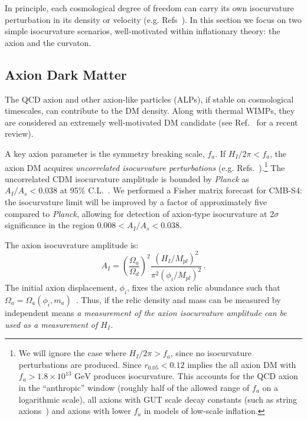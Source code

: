 In principle, each cosmological degree of freedom can carry its own isocurvature perturbation in its density or velocity (e.g. Refs~\cite{Bucher:1999re,Bucher:2004an,Moodley:2004nz}). In this section we focus on two simple isocurvature scenarios, well-motivated within inflationary theory: the axion and the curvaton.

\subsection{Axion Dark Matter}

The QCD axion and other axion-like particles (ALPs), if stable on cosmological timescales, can contribute to the DM density. Along with thermal WIMPs, they are considered an extremely well-motivated DM candidate (see Ref.~\cite{Marsh:2015xka} for a recent review).

A key axion parameter is the symmetry breaking scale, $f_a$. If $H_I/2\pi<f_a$, the axion DM acquires \emph{uncorrelated isocurvature perturbations} (e.g. Refs.~\cite{Axenides:1983hj,Fox:2004kb,Hertzberg:2008wr}).\footnote{We will ignore the case where $H_I/2\pi>f_a$, since no isocurvature perturbations are produced. Since $r_{0.05}<0.12$ implies the all axion DM with $f_a>1.8\times 10^{13}\text{ GeV}$ produces isocurvature. This accounts for the QCD axion in the ``anthropic'' window (roughly half of the allowed range of $f_a$ on a logarithmic scale), all axions with GUT scale decay constants (such as string axions~\cite{Svrcek:2006yi,Arvanitaki:2009fg}) and axions with lower $f_a$ in models of low-scale inflation.} The uncorrelated CDM isocurvature amplitude is bounded by \emph{Planck} as $A_I/A_s<0.038$ at 95\% C.L.~\cite{Ade:2015lrj}. We performed a Fisher matrix forecast for CMB-S4: the isocurvature limit will be improved by a factor of approximately five compared to \emph{Planck}, allowing for detection of axion-type isocurvature at 2$\sigma$ significance in the region $0.008<A_I/A_s<0.038$.

The axion isocuvrature amplitude is:
\begin{equation}
A_I = \left(\frac{\Omega_a}{\Omega_d}\right)^2\frac{(H_I/M_{pl})^2}{\pi^2(\phi_i/M_{pl})^2} \, .
\label{eqn:iso_amplitude}
\end{equation}
The initial axion displacement, $\phi_i$, fixes the axion relic abundance such that $\Omega_a=\Omega_a (\phi_i,m_a)$~\cite{Preskill:1982cy,Abbott:1982af,Dine:1982ah,Turner:1983he,Steinhardt:1983ia,Marsh:2010wq}. Thus, if the relic density and mass can be measured by independent means \emph{a measurement of the axion isocurvature amplitude can be used as a measurement of $H_I$.}


